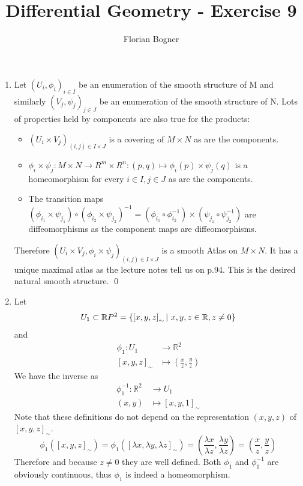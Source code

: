 \documentclass[a4paper,11pt,notitlepage,fullpage]{article}
\begin{document}
\author{Florian Bogner}
\title{Differential Geometry - Exercise 9}
\maketitle


\begin{enumerate}
\item Let $(U_i, \phi_i)_{i\in I}$ be an enumeration of the smooth structure of M and similarly $(V_j, \psi_j)_{j\in J}$ be an enumeration of the smooth structure of N. Lots of properties held by components are also true for the products:
\begin{itemize}
\item $(U_i\times V_j)_{(i,j)\in I\times J}$ is a covering of $M \times N$ as are the components.
\item $\phi_i \times \psi_j: M\times N \to R^m \times R^n: (p, q) \mapsto \phi_i(p) \times \psi_j(q)$ is a homeomorphism for every $i \in I, j \in J$ as are the components.
\item The transition maps $(\phi_{i_1} \times \psi_{j_1}) \circ (\phi_{i_2} \times \psi_{j_2})^{-1} = (\phi_{i_1} \circ \phi^{-1}_{i_2}) \times (\psi_{j_1} \circ \psi^{-1}_{j_2})$ are diffeomorphisms as the component maps are diffeomorphisms.
\end{itemize}
Therefore $(U_i\times V_j, \phi_i \times \psi_j)_{(i,j)\in I\times J}$ is a smooth Atlas on $M\times N$. It has a unique maximal atlas as the lecture notes tell us on p.94. This is the desired natural smooth structure. \qed


\item Let 
\begin{equation*}
U_1 \subset \mathbb RP^2 = \left\{\left[x,y,z\right]_\sim \centering|~ x, y, z \in \mathbb R, z \neq 0 \right\}
\end{equation*}
and
\begin{align*}
\phi_1 :  U_1 &\to \mathbb R^2 \\
\left[x,y,z\right]_\sim &\mapsto (\frac{x}{z}, \frac{y}{z})
\end{align*}
We have the inverse as
\begin{align*}
\phi_1^{-1} : \mathbb R^2 &\to U_1 \\
(x,y) &\mapsto \left[x,y,1\right]_\sim
\end{align*}
Note that these definitions do not depend on the representation $(x,y,z)$ of $\left[x,y,z\right]_\sim$.
\begin{equation*}
\phi_1(\left[x,y,z\right]_\sim) = \phi_1(\left[\lambda x,\lambda y,\lambda z\right]_\sim) = (\frac{\lambda x}{\lambda z}, \frac{\lambda y}{\lambda z}) = (\frac{x}{z}, \frac{y}{z})
\end{equation*}
Therefore and because $z \neq 0$ they are well defined. Both $\phi_1$ and $\phi_1^{-1}$ are obviously continuous, thus $\phi_1$ is indeed a homeomorphism. 


\end{enumerate}
\end{document}
